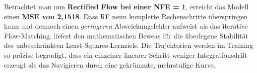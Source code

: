 \documentclass[11pt,a4paper]{article}
\begin{document}
Betrachtet man nun \textbf{Rectified Flow bei einer NFE = 1}, erreicht das Modell einen \textbf{MSE von 2,1518}. Dass RF neun komplette Rechenschritte überspringen kann und dennoch einen \textit{geringeren} Abweichungsfehler aufweist als das iterative Flow-Matching, liefert den mathematischen Beweas für die überlegene Stabilität des unbeschränkten Least-Squares-Lernziels. Die Trajektorien werden im Training so präzise begradigt, dass ein einzelner linearer Schritt weniger Integrationsdrift erzeugt als das Navigieren durch eine gekrümmte, mehrstufige Kurve.
\end{document}
